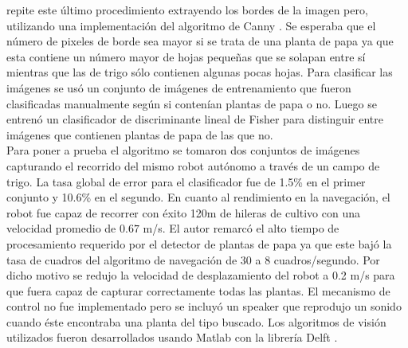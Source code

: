 	 repite este \'ultimo procedimiento extrayendo los bordes de la 
	 imagen pero,  
	 utilizando una implementaci\'on del algoritmo de Canny 
	 \cite{Canny:1986:ACA}. Se esperaba que el n\'umero de pixeles de 
	 borde sea mayor si se trata de una planta de papa ya que esta 
	 contiene un n\'umero mayor de hojas peque\~nas que se solapan entre s\'i 
	 mientras que las de trigo s\'olo contienen algunas pocas hojas. 
	 Para clasificar las im\'agenes se us\'o un conjunto de im\'agenes de entrenamiento
	 que fueron clasificadas manualmente seg\'un si conten\'ian 
	 plantas de papa o no. Luego se entren\'o un 
	 clasificador de discriminante lineal de Fisher \cite{HastieEtAl2008} para distinguir 
	 entre im\'agenes que contienen plantas de papa de las que no.\\
	 \indent Para poner a prueba el algoritmo se tomaron dos conjuntos de 
	 im\'agenes capturando el recorrido del mismo robot aut\'onomo a 
	 trav\'es de un campo de trigo. La tasa global de error para el 
	 clasificador fue de 1.5\% en el primer conjunto y 10.6\% en el 
	 segundo. En cuanto al rendimiento en la navegaci\'on, el robot 
	 fue capaz de recorrer con \'exito 120m de hileras de cultivo con 
	 una velocidad promedio de $0.67$ m/s. El autor remarc\'o el alto 
	 tiempo de procesamiento requerido por el detector de plantas de 
	 papa ya que este baj\'o la tasa de cuadros del algoritmo de 
	 navegaci\'on de 30 a 8 cuadros/segundo. Por dicho motivo se 
	 redujo la velocidad de desplazamiento del robot a 0.2 m/s para 
	 que fuera capaz de capturar correctamente todas las plantas. 
	 El mecanismo de control no fue implementado pero se incluy\'o un 
	 speaker que reprodujo un sonido cuando \'este encontraba una planta 
	 del tipo buscado. Los algoritmos de visi\'on utilizados fueron 
	 desarrollados usando Matlab con la librer\'ia Delft \cite{DipLib}.
	 
